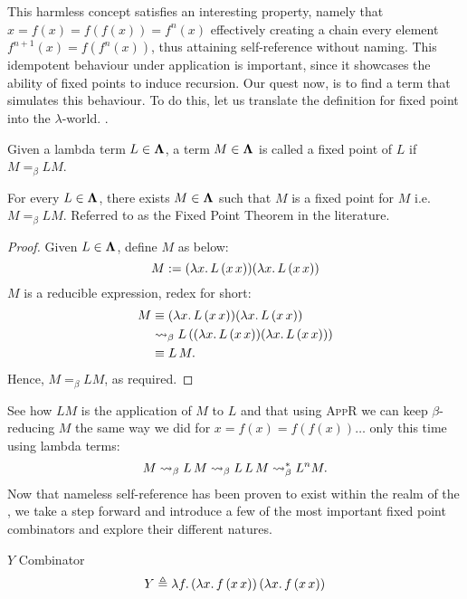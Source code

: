 \documentclass[12pt]{book}
\begin{document}
This harmless concept satisfies an interesting property, namely that $ x = f(x) = f(f(x)) = f^n(x) $ effectively creating a chain every element $ f^{n+1}(x) = f(f^{n}(x))$, thus attaining self-reference without naming. This idempotent behaviour under application is important, since it showcases the ability of fixed points to induce recursion. Our quest now, is to find a term that simulates this behaviour. To do this, let us translate the definition for fixed point into the $\lambda$-world.
.
\begin{definition}
  Given a lambda term \( L \in \mathbf{\Lambda} \), a term \( M \in \mathbf{\Lambda} \) is called a fixed point of \( L \) if \( M =_\beta L M \).
\end{definition}
\begin{theorem}
  For every \( L \in \mathbf{\Lambda} \), there exists \( M \in \mathbf{\Lambda} \) such that $ M $ is a fixed point for $ M $ i.e. $ M =_\beta L M $. Referred to as the Fixed Point Theorem in the literature.
\end{theorem}
\begin{proof} Given $L \in \mathbf{\Lambda}$, define $M$ as below:
  \[
    M := (\lambda x . \, L \, (x \, x))(\lambda x . \, L \, (x \, x))
  \]
  $M$ is a reducible expression, redex for short:
  \begin{align*}
    M 
    &\equiv (\lambda x . \, L \, (x \, x))(\lambda x . \, L \, (x \, x)) \\
    &\mathrel{\leadsto}_\beta L \, ((\lambda x . \, L \, (x \, x))(\lambda x . \, L\, (x \, x))) \\
    &\equiv L \, M.
  \end{align*}
  Hence, $ M =_\beta L M $, as required.
\end{proof}
  See how $ L M $ is the application of $ M $ to $ L $ and that using \textsc{AppR} we can keep $\beta$-reducing $ M $ the same way we did for $ x = f(x) = f(f(x))\dots $ only this time using lambda terms:
  \[
    M \mathrel{\leadsto}_\beta L \, M \mathrel{\leadsto}_\beta L \, L \, M \mathrel{\leadsto}_\beta^* L^n M.
  \]
Now that nameless self-reference has been proven to exist within the realm of the \lcalc, we take a step forward and introduce a few of the most important fixed point combinators and explore their different natures.
\begin{definition} $Y$ Combinator
\[
  Y \triangleq \lambda f.\, (\lambda x.\, f\, (x\, x))\, (\lambda x.\, f\, (x\, x))
\]
\end{definition}
\end{document}
